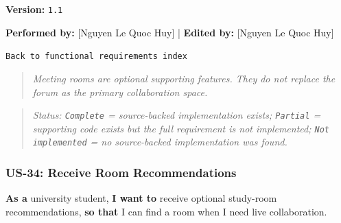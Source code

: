 \documentclass[12pt]{article}
\begin{document}
\textbf{Version:} \texttt{1.1}
\par\medskip

\textbf{Performed by:} [Nguyen Le Quoc Huy] | \textbf{Edited by:} [Nguyen Le Quoc Huy]
\par\medskip

\texttt{Back to functional requirements index}
\par\medskip

\begin{quote}
\textit{Meeting rooms are optional supporting features. They do not replace the forum as the primary collaboration space.}
\end{quote}
\par\medskip

\begin{quote}
\textit{Status: \texttt{Complete} = source-backed implementation exists; \texttt{Partial} = supporting code exists but the full requirement is not implemented; \texttt{Not implemented} = no source-backed implementation was found.}
\end{quote}
\par\medskip

\hypertarget{sec:us-34-receive-room-recommendations}{}
\subsubsection*{US-34: Receive Room Recommendations}
\par\medskip

\textbf{As a} university student, \textbf{I want to} receive optional study-room recommendations, \textbf{so that} I can find a room when I need live collaboration.
\par\medskip
\end{document}

